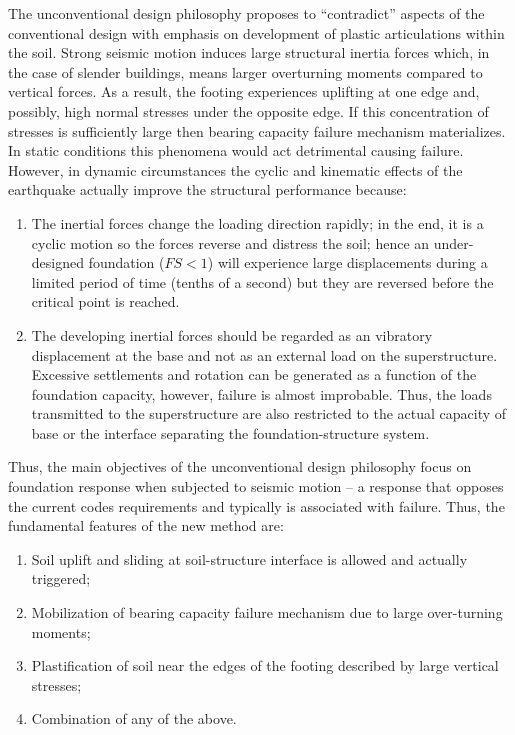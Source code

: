 \documentclass[11pt,a4paper]{report}
\begin{document}
The unconventional design philosophy proposes to “contradict” aspects of the conventional design with emphasis on development of plastic articulations within the soil. Strong seismic motion induces large structural inertia forces which, in the case of slender buildings, means larger overturning moments compared to vertical forces. As a result, the footing experiences uplifting at one edge and, possibly, high normal stresses under the opposite edge. If this concentration of stresses is sufficiently large then bearing capacity failure mechanism materializes. In static conditions this phenomena would act detrimental causing failure. However, in dynamic circumstances the cyclic and kinematic effects of the earthquake actually improve the structural performance because:
\begin{enumerate}
	\item The inertial forces change the loading direction rapidly; in the end, it is a cyclic motion so the forces reverse and distress the soil; hence an under-designed foundation ($FS<1$) will experience large displacements during a limited period of time (tenths of a second) but they are reversed before the critical point is reached.
	\item The developing inertial forces should be regarded as an vibratory displacement at the base and not as an external load on the superstructure. Excessive settlements and rotation can be generated as a function of the foundation capacity, however, failure is almost improbable. Thus, the loads transmitted to the superstructure are also restricted to the actual capacity of base or the interface separating the foundation-structure system.
\end{enumerate}

Thus, the main objectives of the unconventional design philosophy focus on foundation response when subjected to seismic motion – a response that opposes the current codes requirements and typically is associated with failure. Thus, the fundamental features of the new method are: 
\begin{enumerate}
	\item Soil uplift and sliding at soil-structure interface is allowed and actually triggered;
	\item Mobilization of bearing capacity failure mechanism due to large over-turning moments;
	\item Plastification of soil near the edges of the footing described by large vertical stresses; 
	\item Combination of any of the above.
\end{enumerate}
\end{document}
